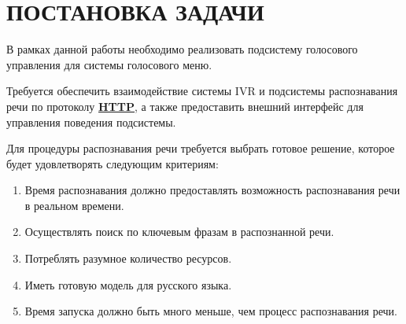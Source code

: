 \chapter{ПОСТАНОВКА ЗАДАЧИ}

В рамках данной работы необходимо реализовать подсистему голосового управления
для системы голосового меню.

Требуется обеспечить взаимодействие системы IVR и подсистемы распознавания речи
по протоколу \hyperlink{http}{\textbf{HTTP}}, а также предоставить внешний
интерфейс для управления поведения подсистемы.

Для процедуры распознавания речи требуется выбрать готовое решение, которое будет
удовлетворять следующим критериям:
\begin{enumerate}
    \item Время распознавания должно предоставлять возможность распознавания речи
        в реальном времени.
    \item Осуществлять поиск по ключевым фразам в распознанной речи.
    \item Потреблять разумное количество ресурсов.
    \item Иметь готовую модель для русского языка.
    \item Время запуска должно быть много меньше, чем процесс распознавания речи.
\end{enumerate}
